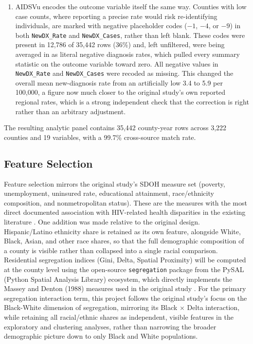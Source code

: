 \documentclass[11pt,letterpaper]{article}
\begin{document}
\begin{enumerate}[leftmargin=1.4em]
\item AIDSVu encodes the outcome variable itself the same way. Counties with low case counts, where reporting a precise rate would risk re-identifying individuals, are marked with negative placeholder codes ($-1$, $-4$, or $-9$) in both \texttt{NewDX\_Rate} and \texttt{NewDX\_Cases}, rather than left blank. These codes were present in 12,786 of 35,442 rows (36\%) and, left unfiltered, were being averaged in as literal negative diagnosis rates, which pulled every summary statistic on the outcome variable toward zero. All negative values in \texttt{NewDX\_Rate} and \texttt{NewDX\_Cases} were recoded as missing. This changed the overall mean new-diagnosis rate from an artificially low 3.4 to 5.9 per 100,000, a figure now much closer to the original study's own reported regional rates, which is a strong independent check that the correction is right rather than an arbitrary adjustment.
\end{enumerate}

\noindent The resulting analytic panel contains 35,442 county-year rows across 3,222 counties and 19 variables, with a 99.7\% cross-source match rate.

\subsection{Feature Selection}
Feature selection mirrors the original study's SDOH measure set (poverty, unemployment, uninsured rate, educational attainment, race/ethnicity composition, and nonmetropolitan status). These are the measures with the most direct documented association with HIV-related health disparities in the existing literature \cite{garrett2026}. One addition was made relative to the original design. Hispanic/Latino ethnicity share is retained as its own feature, alongside White, Black, Asian, and other race shares, so that the full demographic composition of a county is visible rather than collapsed into a single racial comparison. Residential segregation indices (Gini, Delta, Spatial Proximity) will be computed at the county level using the open-source \texttt{segregation} package from the PySAL (Python Spatial Analysis Library) ecosystem, which directly implements the Massey and Denton (1988) measures used in the original study \cite{massey1988}. For the primary segregation interaction term, this project follows the original study's focus on the Black-White dimension of segregation, mirroring its Black $\times$ Delta interaction, while retaining all racial/ethnic shares as independent, visible features in the exploratory and clustering analyses, rather than narrowing the broader demographic picture down to only Black and White populations.
\end{document}
